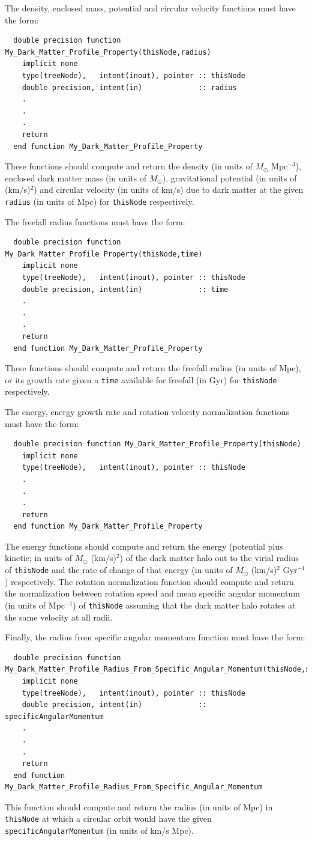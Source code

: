 The density, enclosed mass, potential and circular velocity functions must have the form:
\begin{verbatim}
  double precision function My_Dark_Matter_Profile_Property(thisNode,radius)
    implicit none
    type(treeNode),   intent(inout), pointer :: thisNode
    double precision, intent(in)             :: radius
    .
    .
    .
    return
  end function My_Dark_Matter_Profile_Property
\end{verbatim}
These functions should compute and return the density (in units of $M_\odot$ Mpc$^{-3}$), enclosed dark matter mass (in units of $M_\odot$), gravitational potential (in units of (km/s)$^2$) and circular velocity (in units of km/s) due to dark matter at the given {\tt radius} (in units of Mpc) for {\tt thisNode} respectively.

The freefall radius functions must have the form:
\begin{verbatim}
  double precision function My_Dark_Matter_Profile_Property(thisNode,time)
    implicit none
    type(treeNode),   intent(inout), pointer :: thisNode
    double precision, intent(in)             :: time
    .
    .
    .
    return
  end function My_Dark_Matter_Profile_Property
\end{verbatim}
These functions should compute and return the freefall radius (in units of Mpc), or its growth rate given a {\tt time} available for freefall (in Gyr) for {\tt thisNode} respectively.

The energy, energy growth rate and rotation velocity normalization functions must have the form:
\begin{verbatim}
  double precision function My_Dark_Matter_Profile_Property(thisNode)
    implicit none
    type(treeNode),   intent(inout), pointer :: thisNode
    .
    .
    .
    return
  end function My_Dark_Matter_Profile_Property
\end{verbatim}
The energy functions should compute and return the energy (potential plus kinetic; in units of $M_\odot$ (km/s)$^2$) of the dark matter halo out to the virial radius of {\tt thisNode} and the rate of change of that energy (in units of $M_\odot$ (km/s)$^2$ Gyr$^{-1}$) respectively. The rotation normalization function should compute and return the normalization between rotation speed and mean specific angular momentum (in units of Mpc$^{-1}$) of {\tt thisNode} assuming that the dark matter halo rotates at the same velocity at all radii.

Finally, the radius from specific angular momentum function must have the form:
\begin{verbatim}
  double precision function My_Dark_Matter_Profile_Radius_From_Specific_Angular_Momentum(thisNode,specificAngularMomentum)
    implicit none
    type(treeNode),   intent(inout), pointer :: thisNode
    double precision, intent(in)             :: specificAngularMomentum
    .
    .
    .
    return
  end function My_Dark_Matter_Profile_Radius_From_Specific_Angular_Momentum
\end{verbatim}
This function should compute and return the radius (in units of Mpc) in {\tt thisNode} at which a circular orbit would have the given {\tt specificAngularMomentum} (in units of km/s Mpc).

